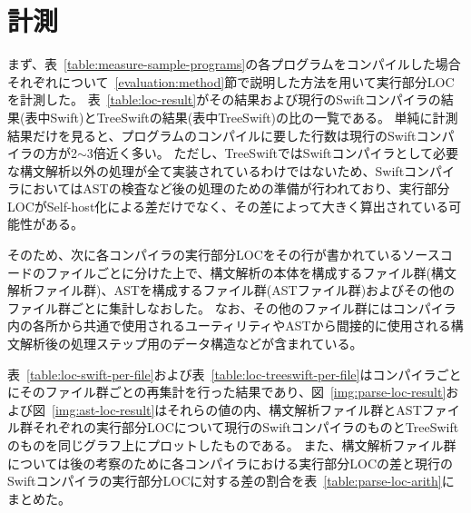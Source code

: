 \section{計測}
\label{evaluation:measure}

まず、表~\ref{table:measure-sample-programs}の各プログラムをコンパイルした場合それぞれについて~\ref{evaluation:method}節で説明した方法を用いて実行部分LOCを計測した。
表~\ref{table:loc-result}がその結果および現行のSwiftコンパイラの結果(表中Swift)とTreeSwiftの結果(表中TreeSwift)の比の一覧である。
単純に計測結果だけを見ると、プログラムのコンパイルに要した行数は現行のSwiftコンパイラの方が2$\sim$3倍近く多い。
ただし、TreeSwiftではSwiftコンパイラとして必要な構文解析以外の処理が全て実装されているわけではないため、SwiftコンパイラにおいてはASTの検査など後の処理のための準備が行われており、実行部分LOCがSelf-host化による差だけでなく、その差によって大きく算出されている可能性がある。

そのため、次に各コンパイラの実行部分LOCをその行が書かれているソースコードのファイルごとに分けた上で、構文解析の本体を構成するファイル群(構文解析ファイル群)、ASTを構成するファイル群(ASTファイル群)およびその他のファイル群ごとに集計しなおした。
なお、その他のファイル群にはコンパイラ内の各所から共通で使用されるユーティリティやASTから間接的に使用される構文解析後の処理ステップ用のデータ構造などが含まれている。

表~\ref{table:loc-swift-per-file}および表~\ref{table:loc-treeswift-per-file}はコンパイラごとにそのファイル群ごとの再集計を行った結果であり、図~\ref{img:parse-loc-result}および図~\ref{img:ast-loc-result}はそれらの値の内、構文解析ファイル群とASTファイル群それぞれの実行部分LOCについて現行のSwiftコンパイラのものとTreeSwiftのものを同じグラフ上にプロットしたものである。
また、構文解析ファイル群については後の考察のために各コンパイラにおける実行部分LOCの差と現行のSwiftコンパイラの実行部分LOCに対する差の割合を表~\ref{table:parse-loc-arith}にまとめた。

